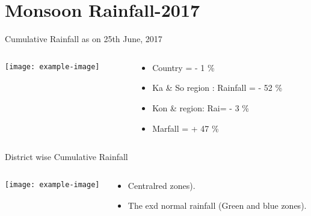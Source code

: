 \documentclass[handout,t]{beamer}
\begin{document}
\section{Monsoon Rainfall-2017}
\begin{frame}{Cumulative Rainfall as on 25th June, 2017}
\begin{columns}[onlytextwidth,T]
    \begin{column}{.45\textwidth}
        \texttt{[image: example-image]}
    \end{column}
    \begin{column}{.47\textwidth}
        \begin{itemize}
            \item Country =  - 1 \% 
            \item Ka \& So region : Rainfall = - 52 \% 
            \item Kon \& region: Rai= - 3 \% 
            \item Marfall = + 47 \%
        \end{itemize}
    \end{column}
\end{columns}
\end{frame}


\begin{frame}{District wise Cumulative Rainfall}
\begin{columns}[onlytextwidth,T]
    \begin{column}{.45\textwidth}
        \texttt{[image: example-image]}
    \end{column}
    \begin{column}{.48\textwidth}
        \begin{itemize}
            \item\justifying Centralred zones).

            \item\justifying The exd normal rainfall (Green and blue zones). 
        \end{itemize}
    \end{column}
\end{columns}
\end{frame}


\end{document}
